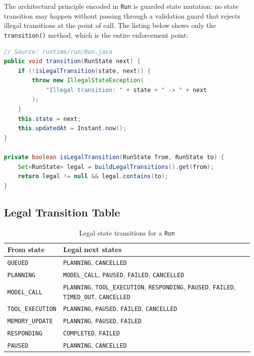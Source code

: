 The architectural principle encoded in \texttt{Run} is guarded state mutation:
no state transition may happen without passing through a validation guard that
rejects illegal transitions at the point of call.
The listing below shows only the \texttt{transition()} method, which is the entire
enforcement point:

\begin{lstlisting}[language=Java,caption={Guarded transition method --- \texttt{runtime/run/Run.java}},label={lst:run-transition}]
// Source: runtime/run/Run.java
public void transition(RunState next) {
    if (!isLegalTransition(state, next)) {
        throw new IllegalStateException(
            "Illegal transition: " + state + " -> " + next
        );
    }
    this.state = next;
    this.updatedAt = Instant.now();
}

private boolean isLegalTransition(RunState from, RunState to) {
    Set<RunState> legal = buildLegalTransitions().get(from);
    return legal != null && legal.contains(to);
}
\end{lstlisting}

\subsection{Legal Transition Table}
\label{subsec:legal-transitions}

\begin{table}[htbp]
\centering
\caption{Legal state transitions for a \texttt{Run}}
\label{tab:legal-transitions}
\begin{tabular}{ll}
\toprule
\textbf{From state} & \textbf{Legal next states} \\
\midrule
\texttt{QUEUED}          & \texttt{PLANNING},\; \texttt{CANCELLED} \\
\texttt{PLANNING}        & \texttt{MODEL\_CALL},\; \texttt{PAUSED},\; \texttt{FAILED},\; \texttt{CANCELLED} \\
\texttt{MODEL\_CALL}    & \texttt{PLANNING},\; \texttt{TOOL\_EXECUTION},\; \texttt{RESPONDING},\;
                           \texttt{PAUSED},\; \texttt{FAILED},\; \texttt{TIMED\_OUT},\; \texttt{CANCELLED} \\
\texttt{TOOL\_EXECUTION}& \texttt{PLANNING},\; \texttt{PAUSED},\; \texttt{FAILED},\; \texttt{CANCELLED} \\
\texttt{MEMORY\_UPDATE} & \texttt{PLANNING},\; \texttt{PAUSED},\; \texttt{FAILED} \\
\texttt{RESPONDING}      & \texttt{COMPLETED},\; \texttt{FAILED} \\
\texttt{PAUSED}          & \texttt{PLANNING},\; \texttt{CANCELLED} \\
\bottomrule
\end{tabular}
\end{table}

